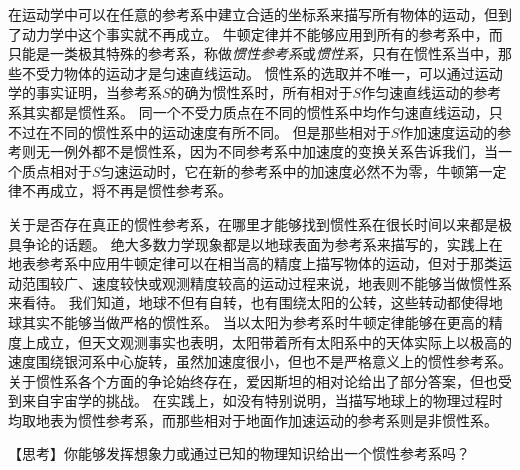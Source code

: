 在运动学中可以在任意的参考系中建立合适的坐标系来描写所有物体的运动，但到了动力学中这个事实就不再成立。
牛顿定律并不能够应用到所有的参考系中，而只能是一类极其特殊的参考系，称做\emph{惯性参考系}或\emph{惯性系}，只有在惯性系当中，那些不受力物体的运动才是匀速直线运动。
惯性系的选取并不唯一，可以通过运动学的事实证明，当参考系$S$的确为惯性系时，所有相对于$S$作匀速直线运动的参考系其实都是惯性系。
同一个不受力质点在不同的惯性系中均作匀速直线运动，只不过在不同的惯性系中的运动速度有所不同。
但是那些相对于$S$作加速度运动的参考则无一例外都不是惯性系，因为不同参考系中加速度的变换关系告诉我们，当一个质点相对于$S$匀速运动时，它在新的参考系中的加速度必然不为零，牛顿第一定律不再成立，将不再是惯性参考系。

关于是否存在真正的惯性参考系，在哪里才能够找到惯性系在很长时间以来都是极具争论的话题。
绝大多数力学现象都是以地球表面为参考系来描写的，实践上在地表参考系中应用牛顿定律可以在相当高的精度上描写物体的运动，但对于那类运动范围较广、速度较快或观测精度较高的运动过程来说，地表则不能够当做惯性系来看待。
我们知道，地球不但有自转，也有围绕太阳的公转，这些转动都使得地球其实不能够当做严格的惯性系。
当以太阳为参考系时牛顿定律能够在更高的精度上成立，但天文观测事实也表明，太阳带着所有太阳系中的天体实际上以极高的速度围绕银河系中心旋转，虽然加速度很小，但也不是严格意义上的惯性参考系。
关于惯性系各个方面的争论始终存在，爱因斯坦的相对论给出了部分答案，但也受到来自宇宙学的挑战。
在实践上，如没有特别说明，当描写地球上的物理过程时均取地表为惯性参考系，而那些相对于地面作加速运动的参考系则是非惯性系。

【思考】你能够发挥想象力或通过已知的物理知识给出一个惯性参考系吗？


